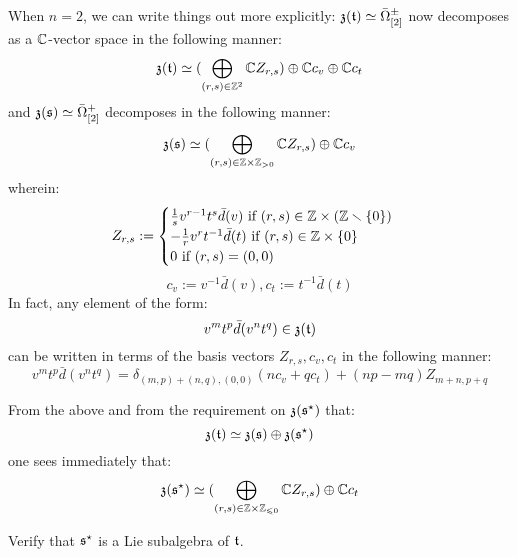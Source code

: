\begin{remark}
                When $n = 2$, we can write things out more explicitly: $\mathfrak{z}(\mathfrak{t}) \simeq \bar{\Omega}_{[2]}^{\pm}$ now decomposes as a $\mathbb{C}$-vector space in the following manner:
                    $$\mathfrak{z}(\mathfrak{t}) \simeq ( \bigoplus_{(r, s) \in \mathbb{Z}^2} \mathbb{C} Z_{r, s}) \oplus \mathbb{C} c_v \oplus \mathbb{C} c_t$$
                and $\mathfrak{z}(\mathfrak{s}) \simeq \bar{\Omega}_{[2]}^+$ decomposes in the following manner:
                    $$\z(\s) \cong ( \bigoplus_{(r, s) \in \Z \x \Z_{> 0}} \bbC Z_{r, s}) \oplus \bbC c_v$$
                wherein:
                    $$
                        Z_{r, s} :=
                        \begin{cases}
                            \text{$\frac1s v^{r - 1} t^s \bar{d}(v)$ if $(r, s) \in \Z \x (\Z \setminus \{0\})$}
                            \\
                            \text{$-\frac1r v^r t^{-1} \bar{d}(t)$ if $(r, s) \in \Z \x \{0\}$}
                            \\
                            \text{$0$ if $(r, s) = (0, 0)$}
                        \end{cases}
                    $$
                    $$c_v := v^{-1} \bar{d}(v), c_t := t^{-1} \bar{d}(t)$$
                In fact, any element of the form:
                    $$v^m t^p \bar{d}(v^n t^q) \in \mathfrak{z}(\mathfrak{t})$$
                can be written in terms of the basis vectors $Z_{r, s}, c_v, c_t$ in the following manner:
                    $$v^m t^p \bar{d}(v^n t^q) = \delta_{(m, p) + (n, q), (0, 0)} ( n c_v + q c_t ) + (np - mq) Z_{m + n, p + q}$$

                From the above and from the requirement on $\mathfrak{z}(\mathfrak{s}^{\star})$ that:
                    $$\mathfrak{z}(\mathfrak{t}) \simeq \mathfrak{z}(\mathfrak{s}) \oplus \mathfrak{z}(\mathfrak{s}^{\star})$$
                one sees immediately that:
                    $$\z(\s^{\star}) \cong ( \bigoplus_{(r, s) \in \Z \x \Z_{\leq 0}} \bbC Z_{r, s}) \oplus \bbC c_t$$
            \end{remark}
            \begin{question} \label{question: toroidal_dual}
                Verify that $\mathfrak{s}^{\star}$ is a Lie subalgebra of $\mathfrak{t}$.
            \end{question}
